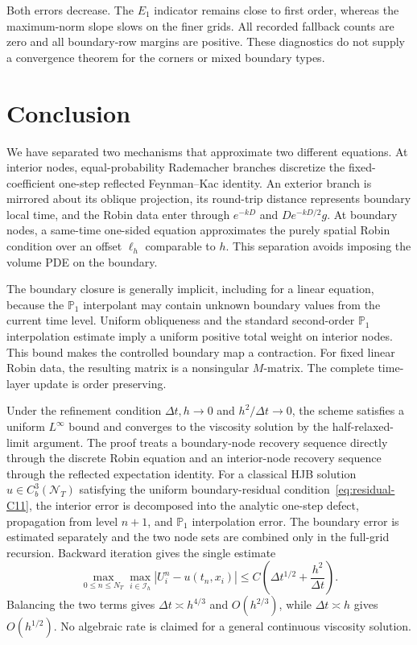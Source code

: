 \documentclass[11pt]{article}
\theoremstyle{definition}
\theoremstyle{remark}
\begin{document}
Both errors decrease.  The $E_1$ indicator remains close to first order,
whereas the maximum-norm slope slows on the finer grids.  All recorded
fallback counts are zero and all boundary-row margins are positive.  These
diagnostics do not supply a convergence theorem for the corners or mixed
boundary types.

\FloatBarrier
	\section{Conclusion}
	\label{sec7}
	We have separated two mechanisms that approximate two different equations.
	At interior nodes, equal-probability Rademacher branches discretize the
	fixed-coefficient one-step reflected Feynman--Kac identity.
	An exterior branch is mirrored about its oblique projection, its round-trip
	distance represents boundary local time, and the Robin data enter through
	$e^{-kD}$ and $De^{-kD/2}g$.  At boundary nodes, a same-time one-sided
	equation approximates the purely spatial Robin condition over an offset
	$\ell_h$ comparable to $h$.  This separation avoids imposing the volume PDE on the
	boundary.
	
	The boundary closure is generally implicit, including for a linear equation,
	because the $\mathbb P_1$ interpolant may contain unknown boundary values from the
	current time level.  Uniform obliqueness and the standard second-order
	$\mathbb P_1$ interpolation estimate imply a
	uniform positive total weight on interior nodes.  This bound makes the
	controlled boundary map a contraction.  For fixed linear Robin data, the
	resulting matrix is a nonsingular $M$-matrix.
	The complete time-layer update is order preserving.
	
	Under the refinement condition $\Delta t,h\to0$ and
	$h^2/\Delta t\to0$, the scheme satisfies a uniform $L^\infty$ bound and
	converges to the viscosity solution by the half-relaxed-limit argument.  The proof treats a boundary-node
	recovery sequence directly through the discrete Robin equation and an
	interior-node recovery sequence through the reflected expectation identity.
	For a classical HJB solution $u\in C_b^3(\mathcal N_T)$ satisfying the
	uniform boundary-residual condition~\eqref{eq:residual-C11}, the interior error is decomposed into the
	analytic one-step defect, propagation from level $n+1$, and $\mathbb P_1$
	interpolation error.  The boundary error is estimated separately and the two
	node sets are combined only in the full-grid recursion.  Backward iteration gives
	the single estimate
	\[
	\max_{0\le n\le N_T}\max_{i\in\mathcal I_h}
	|U_i^n-u(t_n,x_i)|
	\le C\left(\Delta t^{1/2}+\frac{h^2}{\Delta t}\right).
	\]
	Balancing the two terms gives $\Delta t\asymp h^{4/3}$ and
	$O(h^{2/3})$, while $\Delta t\asymp h$ gives $O(h^{1/2})$.  No algebraic
	rate is claimed for a general continuous viscosity solution.
	
\end{document}
